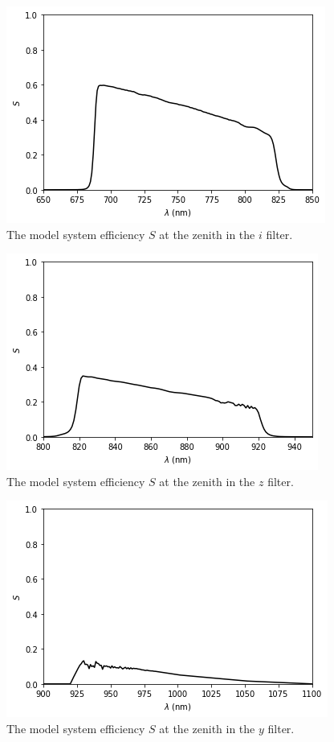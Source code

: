 \begin{figure}
\begin{center}
\includegraphics[width=0.7\linewidth]{figures/huitzi-S-i.png}
\medskip
\caption{The model system efficiency $S$ at the zenith in the $i$ filter.}
\end{center}
\end{figure}

\begin{figure}
\begin{center}
\includegraphics[width=0.7\linewidth]{figures/huitzi-S-z.png}
\medskip
\caption{The model system efficiency $S$ at the zenith in the $z$ filter.}
\end{center}
\end{figure}

\begin{figure}
\begin{center}
\includegraphics[width=0.7\linewidth]{figures/huitzi-S-y.png}
\medskip
\caption{The model system efficiency $S$ at the zenith in the $y$ filter.}
\end{center}
\end{figure}

